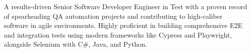 A results-driven Senior Software Developer Engineer in Test with a proven record of spearheading QA automation projects and contributing to high-caliber software in agile environments. Highly proficient in building comprehensive E2E and integration tests using modern frameworks like Cypress and Playwright, alongside Selenium with C\#, Java, and Python.
